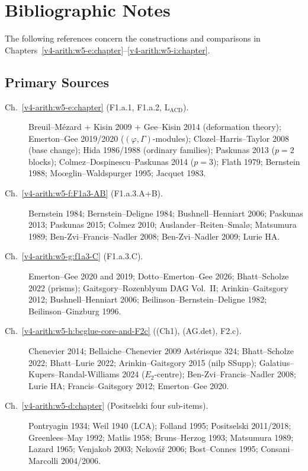 \section{Bibliographic Notes}
\label{v4-arith:w5-synth:disjoint-comparison}

The following references concern the constructions and comparisons
in Chapters~\ref{v4-arith:w5-e:chapter}--\ref{v4-arith:w5-i:chapter}.

\subsection{Primary Sources}
\label{v4-arith:w5-synth:lists}

\begin{description}
\item[Ch.~\ref{v4-arith:w5-e:chapter} (F1.a.1, F1.a.2, \(\mathrm{L}_{\mathrm{ACD}}\)).]
Breuil--M{\'e}zard + Kisin 2009 + Gee--Kisin 2014 (deformation
theory); Emerton--Gee 2019/2020 (\((\varphi,\Gamma)\)-modules);
Clozel--Harris--Taylor 2008 (base change); Hida 1986/1988
(ordinary families); Paskunas 2013 (\(p=2\) blocks);
Colmez--Dospinescu--Paskunas 2014 (\(p=3\)); Flath 1979; Bernstein
1988; Mo{\oe}glin--Waldspurger 1995; Jacquet 1983.

\item[Ch.~\ref{v4-arith:w5-f:F1a3-AB} (F1.a.3.A+B).] Bernstein 1984; Bernstein--Deligne
1984; Bushnell--Henniart 2006; Paskunas 2013; Paskunas 2015;
Colmez 2010; Auslander--Reiten--Smal\o{};
Matsumura 1989; Ben-Zvi--Francis--Nadler 2008; Ben-Zvi--Nadler
2009; Lurie HA.

\item[Ch.~\ref{v4-arith:w5-g:f1a3-C} (F1.a.3.C).] Emerton--Gee 2020 and 2019;
Dotto--Emerton--Gee 2026; Bhatt--Scholze 2022 (prisms);
Gaitsgory--Rozenblyum DAG Vol.~II; Arinkin--Gaitsgory 2012;
Bushnell--Henniart 2006; Beilinson--Bernstein--Deligne 1982;
Beilinson--Ginzburg 1996.

\item[Ch.~\ref{v4-arith:w5-h:bcglue-core-and-F2c} ((Ch1), (AG.det), F2.c).]
Chenevier 2014; Bellaiche--Chenevier 2009
Ast\'erisque 324; Bhatt--Scholze 2022; Bhatt--Lurie 2022;
Arinkin--Gaitsgory 2015 (nilp SSupp);
Galatius--Kupers--Randal-Williams 2024 (\(E_{2}\)-centre);
Ben-Zvi--Francis--Nadler 2008; Lurie HA;
Francis--Gaitsgory 2012; Emerton--Gee 2020.

\item[Ch.~\ref{v4-arith:w5-d:chapter} (Positselski four sub-items).] Pontryagin 1934;
Weil 1940 (LCA); Folland 1995; Positselski 2011/2018;
Greenlees--May 1992; Matlis 1958; Bruns--Herzog 1993;
Matsumura 1989; Lazard 1965; Venjakob 2003; Nekov\'a\v{r} 2006;
Bost--Connes 1995; Consani--Marcolli 2004/2006.


\end{description}
